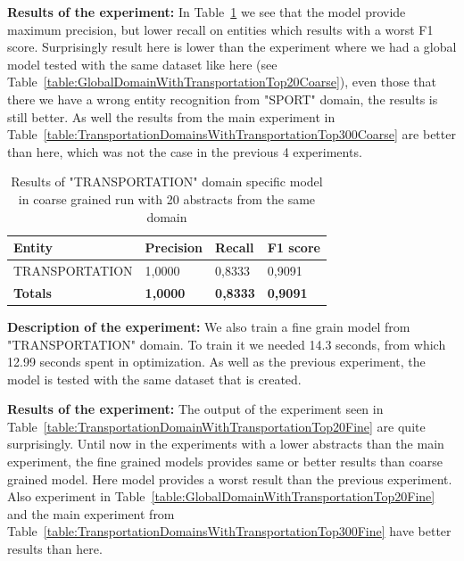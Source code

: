 \documentclass[thesis=M,english]{FITthesis}[2018/05/30]
\begin{document}
\textbf{Results of the experiment:} In Table~\ref{table:TransportationDomainWithTransportationTop20Coarse} we see that the model provide maximum precision, but lower recall on entities which results with a worst F1 score. Surprisingly result here is lower than the experiment where we had a global model tested with the same dataset like here (see Table~\ref{table:GlobalDomainWithTransportationTop20Coarse}), even those that there we have a wrong entity recognition from "SPORT" domain, the results is still better. As well the results from the main experiment in Table~\ref{table:TransportationDomainsWithTransportationTop300Coarse} are better than here, which was not the case in the previous 4 experiments.

	\begin{table}[H]\centering
		\begin{tabular}{|l|l|l|l|}
			\hline {\textbf{Entity}} & {\textbf{Precision}} & {\textbf{Recall}} & {\textbf{F1 score}}\\\hline
				TRANSPORTATION & 1,0000 & 0,8333 & 0,9091\\\hline
				\textbf{Totals} & \textbf{1,0000} & \textbf{0,8333} & \textbf{0,9091}\\\hline
		\end{tabular}
		\caption{Results of "TRANSPORTATION" domain specific model in coarse grained run with 20 abstracts from the same domain \label{table:TransportationDomainWithTransportationTop20Coarse}}			
	\end{table}	
	
\textbf{Description of the experiment:} We also train a fine grain model from "TRANSPORTATION" domain. To train it we needed 14.3 seconds, from which 12.99 seconds spent in optimization. As well as the previous experiment, the model is tested with the same dataset that is created.

\textbf{Results of the experiment:}	The output of the experiment seen in Table~\ref{table:TransportationDomainWithTransportationTop20Fine} are quite surprisingly. Until now in the experiments with a lower abstracts than the main experiment, the fine grained models provides same or better results than coarse grained model. Here model provides a worst result than the previous experiment. Also experiment in Table~\ref{table:GlobalDomainWithTransportationTop20Fine} and the main experiment from Table~\ref{table:TransportationDomainsWithTransportationTop300Fine} have better results than here.
\end{document}
